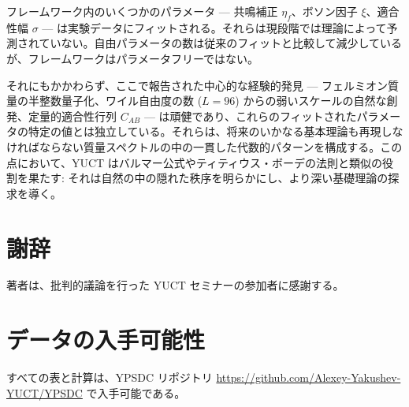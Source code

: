\documentclass[11pt,a4paper]{article}
\theoremstyle{remark}
\begin{document}
	フレームワーク内のいくつかのパラメータ — 共鳴補正 \(\eta_f\)、ボソン因子 \(\xi\)、適合性幅 \(\sigma\) — は実験データにフィットされる。それらは現段階では理論によって予測されていない。自由パラメータの数は従来のフィットと比較して減少しているが、フレームワークはパラメータフリーではない。
	
	それにもかかわらず、ここで報告された中心的な経験的発見 — フェルミオン質量の半整数量子化、ワイル自由度の数 (\(L=96\)) からの弱いスケールの自然な創発、定量的適合性行列 \(C_{AB}\) — は頑健であり、これらのフィットされたパラメータの特定の値とは独立している。それらは、将来のいかなる基本理論も再現しなければならない質量スペクトルの中の一貫した代数的パターンを構成する。この点において、YUCT はバルマー公式やティティウス・ボーデの法則と類似の役割を果たす: それは自然の中の隠れた秩序を明らかにし、より深い基礎理論の探求を導く。
	
	\section*{謝辞}
	著者は、批判的議論を行った YUCT セミナーの参加者に感謝する。
	
	\section*{データの入手可能性}
	すべての表と計算は、YPSDC リポジトリ \url{https://github.com/Alexey-Yakushev-YUCT/YPSDC} で入手可能である。
	
\end{document}

